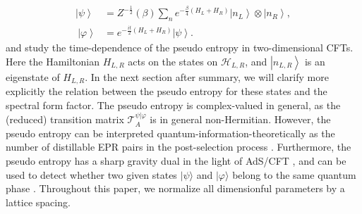 \documentclass[%
twocolumn, 
secnumarabic,amssymb, preprintnumbers, superscriptaddress, aps, prl]{revtex4-1}
\newcommand{\be}{\begin{equation}}
\newcommand{\ee}{\end{equation}}
\newcommand{\Tr}{\text{Tr}}
\newcommand{\ket}[1]{\left| #1 \right>}
\newcommand{\bra}[1]{\left< #1 \right|}
\newcommand{\f}{\frac}
\def\f {\frac}
\def\Tr{\mathrm{Tr}}
\begin{document}
\begin{align} \label{in-out}
\ket{\psi} &= Z^{-\frac{1}{2}}(\beta)\sum_n e^{-\f{\beta}{4} (H_L+H_R)} \ket{n_L}\otimes  \ket{n_R}, \\ ~\ket{\varphi} &=  e^{-\f{it}{2} (H_L+H_R)}\ket{\psi}.\label{in-out2}
\end{align} 
and study the time-dependence of the pseudo entropy in two-dimensional CFTs.
Here the Hamiltonian $H_{L,R}$ acts on the states on $\mathcal{H}_{L,R}$, and $\ket{n_{L,R}}$ is an eigenstate of $H_{L,R}$. In the next section after summary, we will clarify more explicitly the relation between the pseudo entropy for these states and the spectral form factor. The pseudo entropy is complex-valued in general, as the (reduced) transition matrix $\mathcal{T}^{\psi|\varphi}_A$ is in general non-Hermitian. However, the pseudo entropy can be interpreted quantum-information-theoretically as the number of distillable EPR pairs in the post-selection process \cite{Nakata_2021}. Furthermore, the pseudo entropy has a sharp gravity dual in the light of AdS/CFT \cite{Nakata_2021}, and can be used to  detect whether two given states $|\psi\rangle$ and $|\varphi\rangle$
belong to the same quantum phase \cite{Mollabashi:2020yie,Mollabashi:2021xsd,Nishioka:2021cxe}. Throughout this paper, we normalize all dimensionful parameters by a lattice spacing.


\end{document}

